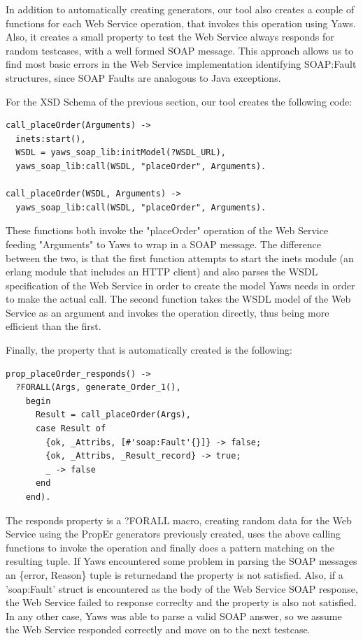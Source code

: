 \documentclass[submission,copyright,a4]{eptcs}
\begin{document}
In addition to automatically creating generators, our tool also creates a couple of functions for each Web Service operation, that invokes this operation using Yaws. Also, it creates a small property to test the Web Service always responds for random testcases, with a well formed SOAP message. This approach allows us to find most basic errors in the Web Service implementation identifying SOAP:Fault structures, since SOAP Faults are analogous to Java exceptions. 

For the XSD Schema of the previous section, our tool creates the following code:

\begin{lstlisting}
call_placeOrder(Arguments) ->
  inets:start(),
  WSDL = yaws_soap_lib:initModel(?WSDL_URL),
  yaws_soap_lib:call(WSDL, "placeOrder", Arguments).
    
call_placeOrder(WSDL, Arguments) ->
  yaws_soap_lib:call(WSDL, "placeOrder", Arguments).
\end{lstlisting}

These functions both invoke the "placeOrder" operation of the Web Service feeding "Arguments" to Yaws to wrap in a SOAP message. The difference between the two, is that the first function attempts to start the inets module (an erlang module that includes an HTTP client) and also parses the WSDL specification of the Web Service in order to create the model Yaws needs in order to make the actual call. The second function takes the WSDL model of the Web Service as an argument and invokes the operation directly, thus being more efficient than the first.

Finally, the property that is automatically created is the following:

\begin{lstlisting}
prop_placeOrder_responds() ->
  ?FORALL(Args, generate_Order_1(),
    begin
      Result = call_placeOrder(Args),
      case Result of 
        {ok, _Attribs, [#'soap:Fault'{}]} -> false;
        {ok, _Attribs, _Result_record} -> true;
        _ -> false
      end
    end).
\end{lstlisting}

The responds property is a ?FORALL macro, creating random data for the Web Service using the PropEr generators previously created, uses the above calling functions to invoke the operation and finally does a pattern matching on the resulting tuple. If Yaws encountered some problem in parsing the SOAP messages an \{error, Reason\} tuple is returnedand the property is not satisfied. Also, if a 'soap:Fault' struct is encountered as the body of the Web Service SOAP response, the Web Service failed to response correclty and the property is also not satisfied. In any other case, Yaws was able to parse a valid SOAP answer, so we assume the Web Service responded correctly and move on to the next testcase.
\end{document}
